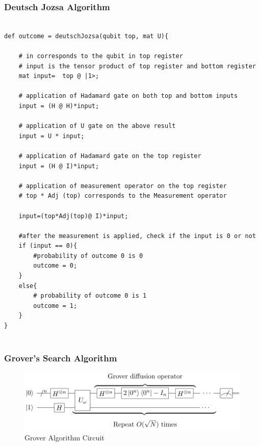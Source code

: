 \subsubsection{Deutsch Jozsa Algorithm}
\begin{lstlisting}

def outcome = deutschJozsa(qubit top, mat U){
		
	# in corresponds to the qubit in top register
	# input is the tensor product of top register and bottom register
	mat input=  top @ |1>;
		
	# application of Hadamard gate on both top and bottom inputs
	input = (H @ H)*input;
		
	# application of U gate on the above result
	input = U * input;
		
	# application of Hadamard gate on the top register
	input = (H @ I)*input;
		
	# application of measurement operator on the top register
	# top * Adj (top) corresponds to the Measurement operator
		
	input=(top*Adj(top)@ I)*input;
		
	#after the measurement is applied, check if the input is 0 or not
	if (input == 0){
		#probability of outcome 0 is 0
		outcome = 0;
	}
	else{
		# probability of outcome 0 is 1
		outcome = 1;
	}
}
	
\end{lstlisting}

\subsubsection {Grover's Search Algorithm}

\begin{figure}[h!]
\begin{center}
\includegraphics{grover}
\end{center}
\caption{ Grover Algorithm Circuit 
\label{cir1}}
\end{figure}

